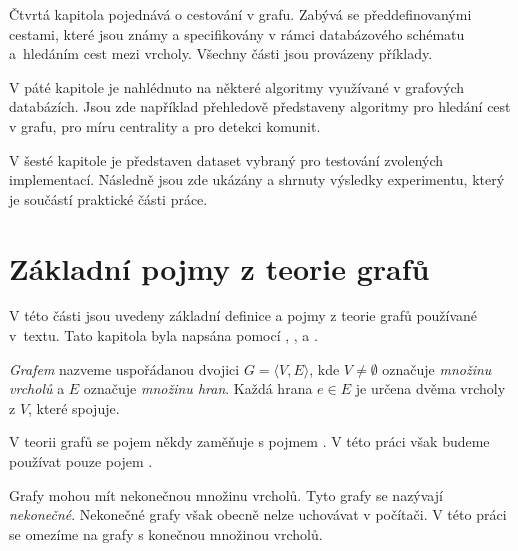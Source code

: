 \documentclass[
  program=infoi,
  biblatex=true,
  figures=true,
  glossaries=false,
  index,
  sourcecodes=true
]{kidiplom}
\begin{document}
Čtvrtá kapitola pojednává o cestování v grafu. Zabývá se předdefinovanými cestami, které jsou známy a specifikovány v rámci databázového schématu a~hledáním cest mezi vrcholy. Všechny části jsou provázeny příklady.

V páté kapitole je nahlédnuto na některé algoritmy využívané v grafových databázích. Jsou zde například přehledově představeny algoritmy pro hledání cest v grafu, pro míru centrality a pro detekci komunit.

V šesté kapitole je představen dataset vybraný pro testování zvolených implementací. Následně jsou zde ukázány a shrnuty výsledky experimentu, který je součástí praktické části práce.

\newpage

\section{Základní pojmy z teorie grafů}

V této části jsou uvedeny základní definice a pojmy z teorie grafů používané v~textu. Tato kapitola byla napsána pomocí \cite{graphIntroduction}, \cite{Ramba_2016}, \cite{disk} a \cite{directedGraph}.

\begin{definition}[Graf]
\textit{Grafem} nazveme uspořádanou dvojici $G = \langle V,E\rangle$, kde $V \neq \emptyset$ označuje \textit{množinu vrcholů} a $E$ označuje \textit{množinu hran}. Každá hrana $e \in E$ je určena dvěma vrcholy z $V$, které spojuje.
\end{definition}

\begin{remark}[Vrchol]
V teorii grafů se pojem  někdy zaměňuje s pojmem . V této práci však budeme používat pouze pojem .
\end{remark}

\begin{remark}
Grafy mohou mít nekonečnou množinu vrcholů. Tyto grafy se nazývají \textit{nekonečné}. Nekonečné grafy však obecně nelze uchovávat v počítači. V této práci se omezíme na grafy s konečnou množinou vrcholů.
\end{remark}
\end{document}

